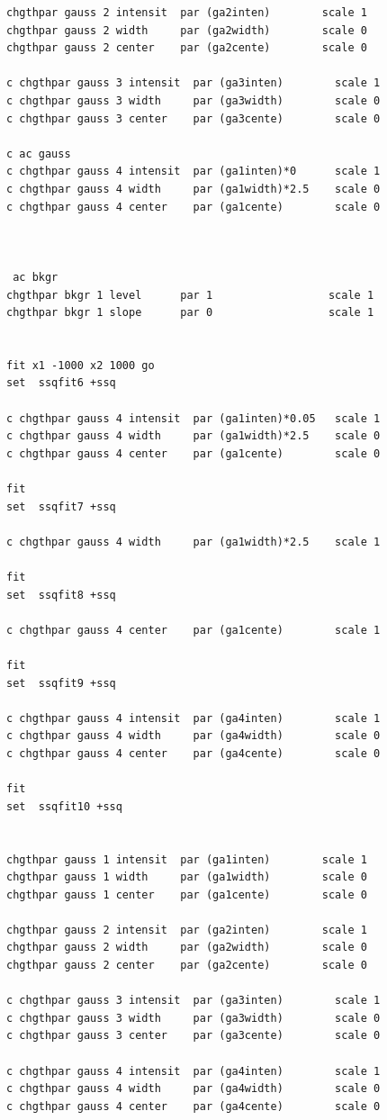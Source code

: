 \documentclass[11pt,fleqn]{book} %
\begin{document}
\begin{verbatim}
chgthpar gauss 2 intensit  par (ga2inten)        scale 1
chgthpar gauss 2 width     par (ga2width)        scale 0
chgthpar gauss 2 center    par (ga2cente)        scale 0

c chgthpar gauss 3 intensit  par (ga3inten)        scale 1
c chgthpar gauss 3 width     par (ga3width)        scale 0
c chgthpar gauss 3 center    par (ga3cente)        scale 0

c ac gauss
c chgthpar gauss 4 intensit  par (ga1inten)*0      scale 1
c chgthpar gauss 4 width     par (ga1width)*2.5    scale 0
c chgthpar gauss 4 center    par (ga1cente)        scale 0



 ac bkgr
chgthpar bkgr 1 level      par 1                  scale 1
chgthpar bkgr 1 slope      par 0                  scale 1


fit x1 -1000 x2 1000 go
set  ssqfit6 +ssq

c chgthpar gauss 4 intensit  par (ga1inten)*0.05   scale 1
c chgthpar gauss 4 width     par (ga1width)*2.5    scale 0
c chgthpar gauss 4 center    par (ga1cente)        scale 0

fit 
set  ssqfit7 +ssq

c chgthpar gauss 4 width     par (ga1width)*2.5    scale 1

fit 
set  ssqfit8 +ssq

c chgthpar gauss 4 center    par (ga1cente)        scale 1

fit 
set  ssqfit9 +ssq

c chgthpar gauss 4 intensit  par (ga4inten)        scale 1
c chgthpar gauss 4 width     par (ga4width)        scale 0
c chgthpar gauss 4 center    par (ga4cente)        scale 0

fit 
set  ssqfit10 +ssq


chgthpar gauss 1 intensit  par (ga1inten)        scale 1
chgthpar gauss 1 width     par (ga1width)        scale 0
chgthpar gauss 1 center    par (ga1cente)        scale 0

chgthpar gauss 2 intensit  par (ga2inten)        scale 1
chgthpar gauss 2 width     par (ga2width)        scale 0
chgthpar gauss 2 center    par (ga2cente)        scale 0

c chgthpar gauss 3 intensit  par (ga3inten)        scale 1
c chgthpar gauss 3 width     par (ga3width)        scale 0
c chgthpar gauss 3 center    par (ga3cente)        scale 0

c chgthpar gauss 4 intensit  par (ga4inten)        scale 1
c chgthpar gauss 4 width     par (ga4width)        scale 0
c chgthpar gauss 4 center    par (ga4cente)        scale 0




\end{verbatim}
\end{document}
